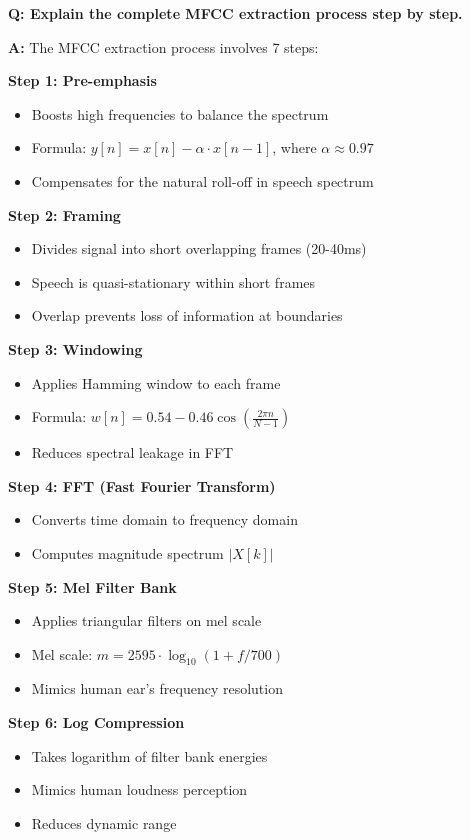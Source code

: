 \documentclass[a4paper,12pt]{article}
\newcommand{\vivaQ}[1]{\textcolor{questioncolor}{\textbf{Q: #1}}}
\newcommand{\vivaA}[1]{\textcolor{answercolor}{\textbf{A:}} #1}
\begin{document}
\vspace{0.5cm}

\vivaQ{Explain the complete MFCC extraction process step by step.}

\vivaA{The MFCC extraction process involves 7 steps:

\textbf{Step 1: Pre-emphasis}
\begin{itemize}
    \item Boosts high frequencies to balance the spectrum
    \item Formula: $y[n] = x[n] - \alpha \cdot x[n-1]$, where $\alpha \approx 0.97$
    \item Compensates for the natural roll-off in speech spectrum
\end{itemize}

\textbf{Step 2: Framing}
\begin{itemize}
    \item Divides signal into short overlapping frames (20-40ms)
    \item Speech is quasi-stationary within short frames
    \item Overlap prevents loss of information at boundaries
\end{itemize}

\textbf{Step 3: Windowing}
\begin{itemize}
    \item Applies Hamming window to each frame
    \item Formula: $w[n] = 0.54 - 0.46 \cos\left(\frac{2\pi n}{N-1}\right)$
    \item Reduces spectral leakage in FFT
\end{itemize}

\textbf{Step 4: FFT (Fast Fourier Transform)}
\begin{itemize}
    \item Converts time domain to frequency domain
    \item Computes magnitude spectrum $|X[k]|$
\end{itemize}

\textbf{Step 5: Mel Filter Bank}
\begin{itemize}
    \item Applies triangular filters on mel scale
    \item Mel scale: $m = 2595 \cdot \log_{10}(1 + f/700)$
    \item Mimics human ear's frequency resolution
\end{itemize}

\textbf{Step 6: Log Compression}
\begin{itemize}
    \item Takes logarithm of filter bank energies
    \item Mimics human loudness perception
    \item Reduces dynamic range
\end{itemize}

}
\end{document}
